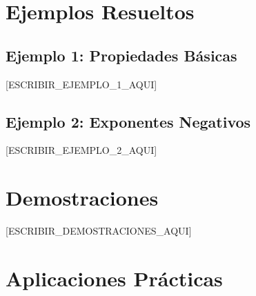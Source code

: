 \begin{teoria}
\section{Ejemplos Resueltos}

\subsection{Ejemplo 1: Propiedades Básicas}

[ESCRIBIR_EJEMPLO_1_AQUI]

% 
% 

\subsection{Ejemplo 2: Exponentes Negativos}

[ESCRIBIR_EJEMPLO_2_AQUI]


\section{Demostraciones}

[ESCRIBIR_DEMOSTRACIONES_AQUI]

% 


\section{Aplicaciones Prácticas}


\end{teoria}
